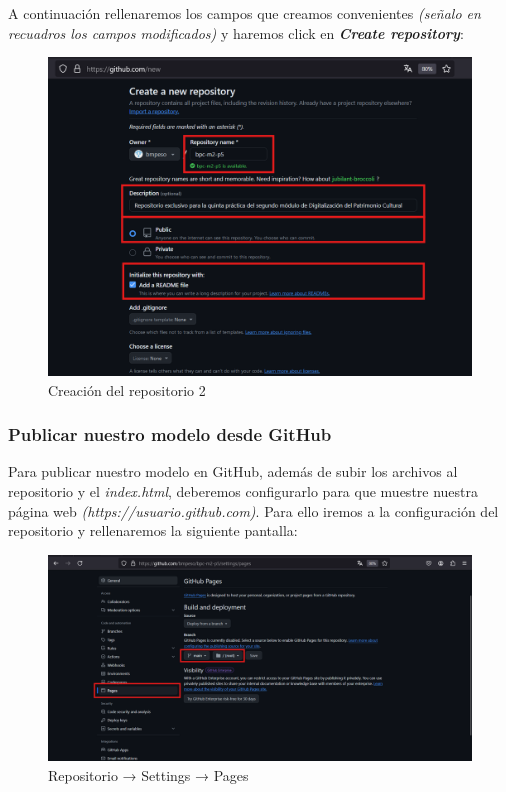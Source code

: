 \documentclass[options]{article}
\begin{document}
A continuación rellenaremos los campos que creamos convenientes \textit{(señalo en recuadros los campos modificados)} y haremos click en \textbf{\textit{Create repository}}:

\begin{figure}[H]
    \centering
    \includegraphics[scale=0.34]{images/github_02.png}
    \caption{Creación del repositorio 2}
\end{figure}

\pagebreak

\subsubsection{Publicar nuestro modelo desde GitHub}

Para publicar nuestro modelo en GitHub, además de subir los archivos al repositorio y el \textit{index.html}, deberemos configurarlo para que muestre nuestra página web \textit{(https://usuario.github.com)}. Para ello iremos a la configuración del repositorio y rellenaremos la siguiente pantalla:

\begin{figure}[H]
    \centering
    \includegraphics[scale=0.34]{images/publicacion_02.png}
    \caption{Repositorio → Settings → Pages}
\end{figure}
\end{document}
